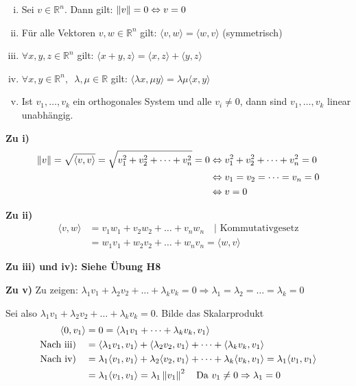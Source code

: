 \begin{enumerate}[i)]
  \item{Sei $v \in \mathbb{R}^n$. Dann gilt: $\left\lVert v\right\rVert = 0 \Leftrightarrow v = 0$}
  \item{Für alle Vektoren $v, w \in \mathbb{R}^n$ gilt: $\langle v, w\rangle = \langle w, v\rangle$ (\glqq{}symmetrisch\grqq{})}
  \item{$\forall x, y, z \in \mathbb{R}^n$ gilt: $\langle x+y, z\rangle = \langle x, z\rangle + \langle y, z\rangle$}
  \item{$\forall x, y \in \mathbb{R}^n,\enspace \lambda, \mu \in \mathbb{R}$ gilt: $\langle\lambda x, \mu y\rangle = \lambda\mu\langle x, y\rangle$}
  \item{Ist $v_1,\dots,v_k$ ein orthogonales System und alle $v_i \neq 0$, dann sind $v_1,\dots,v_k$ linear unabhängig.}
\end{enumerate}

\textbf{Zu i)}
\begin{align*}
	\left\lVert v\right\rVert = \sqrt{\langle v, v\rangle} = \sqrt{v_1^2+v_2^2+\dots +v_n^2} = 0 &\Leftrightarrow v_1^2+v_2^2+\dots +v_n^2 = 0 \\
	&\Leftrightarrow v_1 = v_2 = \dots = v_n = 0 \\
	&\Leftrightarrow v = 0
\end{align*}

\textbf{Zu ii)}
\begin{align*}
	\langle v, w\rangle &= v_1w_1+v_2w_2+\dots +v_nw_n\quad|\text{ Kommutativgesetz} \\
	&= w_1v_1+w_2v_2+\dots +w_nv_n = \langle w, v\rangle
\end{align*}

\textbf{Zu iii) und iv): Siehe Übung H8}

\textbf{Zu v)}
Zu zeigen: $\lambda_1v_1+\lambda_2v_2+\dots +\lambda_kv_k = 0 \Rightarrow \lambda_1 = \lambda_2 = \dots = \lambda_k = 0$

Sei also $\lambda_1v_1+\lambda_2v_2+\dots +\lambda_kv_k = 0$. Bilde das Skalarprodukt
\begin{align*}
	\langle 0, v_1\rangle &= 0 = \langle \lambda_1v_1+\dots +\lambda_kv_k, v_1\rangle \\
	\text{Nach iii)}\quad &= \langle \lambda_1v_1, v_1\rangle +\langle \lambda_2v_2, v_1\rangle+\dots +\langle \lambda_kv_k, v_1\rangle \\
	\text{Nach iv)}\quad &=\lambda_1\langle v_1, v_1\rangle + \lambda_2\langle v_2, v_1\rangle + \dots + \lambda_k\langle v_k, v_1\rangle = \lambda_1\langle v_1, v_1\rangle \\
	&= \lambda_1 \langle v_1, v_1\rangle = \lambda_1 \left\lVert v_1\right\rVert^2\quad\text{Da } v_1\neq 0 \Rightarrow \lambda_1 = 0
\end{align*}

